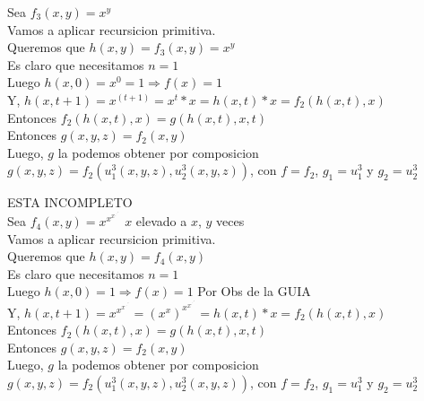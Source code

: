 \documentclass[]{article}
\begin{document}
\pagebreak
\begin{flushleft}
	Sea $f_{3}(x,y) = x^{y}$\linebreak
	\\Vamos a aplicar recursicion primitiva. 
	\\Queremos que $h(x,y) = f_{3}(x,y) = x^{y}$
	\\Es claro que necesitamos $n=1$
	\\Luego $h(x,0) = x^{0} = 1 \Rightarrow f(x) = 1$
	\\Y, $h(x,t+1) = x^{(t+1)} = x^{t} * x = h(x,t) * x = f_{2}(h(x,t),x)$
	\\Entonces 	$f_{2}(h(x,t),x) = g(h(x,t),x,t)$
	\\Entonces $g(x,y,z) = f_{2}(x,y)$
	\\Luego, $g$ la podemos obtener por composicion $g(x,y,z)=f_{2}(u^{3}_{1}(x,y,z),u^{3}_{2}(x,y,z))$, con $f = f_{2}$, $g_{1} = u^{3}_{1}$ y $g_{2} = u^{3}_{2}$
	
\end{flushleft}

\noindent\hrulefill


\begin{flushleft}
	ESTA INCOMPLETO\\
	Sea $f_{4}(x,y) = x^{x^{x^{.^{.^{.^{x}}}}}}$ $x$ elevado a $x$, $y$ veces\linebreak
	\\Vamos a aplicar recursicion primitiva. 
	\\Queremos que $h(x,y) = f_{4}(x,y) $
	\\Es claro que necesitamos $n=1$
	\\Luego $h(x,0) = 1 \Rightarrow f(x) = 1$ Por Obs de la GUIA
	\\Y, $h(x,t+1) = x^{x^{x^{.^{.^{.^{x}}}}}} = (x^{x})^{x^{x^{.^{.^{.^{x}}}}}} = h(x,t) * x = f_{2}(h(x,t),x)$
	\\Entonces 	$f_{2}(h(x,t),x) = g(h(x,t),x,t)$
	\\Entonces $g(x,y,z) = f_{2}(x,y)$
	\\Luego, $g$ la podemos obtener por composicion $g(x,y,z)=f_{2}(u^{3}_{1}(x,y,z),u^{3}_{2}(x,y,z))$, con $f = f_{2}$, $g_{1} = u^{3}_{1}$ y $g_{2} = u^{3}_{2}$
	
\end{flushleft}
\noindent\hrulefill
\end{document}
